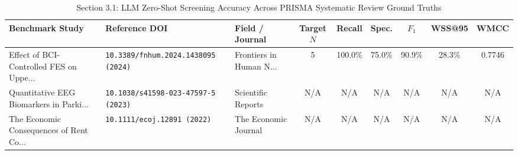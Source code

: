 \begin{table}[t]
\centering
\small
\caption{Section 3.1: LLM Zero-Shot Screening Accuracy Across PRISMA Systematic Review Ground Truths}
\label{tab:validation_screening_prisma}
\begin{tabular}{p{4.2cm}p{3.2cm}p{2.2cm}cccccc}
\hline
\textbf{Benchmark Study} & \textbf{Reference DOI} & \textbf{Field / Journal} & \textbf{Target $N$} & \textbf{Recall} & \textbf{Spec.} & \textbf{$F_1$} & \textbf{WSS@95} & \textbf{WMCC} \\
\hline
Effect of BCI-Controlled FES on Uppe... & \texttt{10.3389/fnhum.2024.1438095 (2024)} & Frontiers in Human N... & 5 & 100.0\% & 75.0\% & 90.9\% & 28.3\% & 0.7746 \\
Quantitative EEG Biomarkers in Parki... & \texttt{10.1038/s41598-023-47597-5 (2023)} & Scientific Reports & N/A & N/A & N/A & N/A & N/A & N/A \\
The Economic Consequences of Rent Co... & \texttt{10.1111/ecoj.12891 (2022)} & The Economic Journal & N/A & N/A & N/A & N/A & N/A & N/A \\
\hline
\end{tabular}
\end{table}
